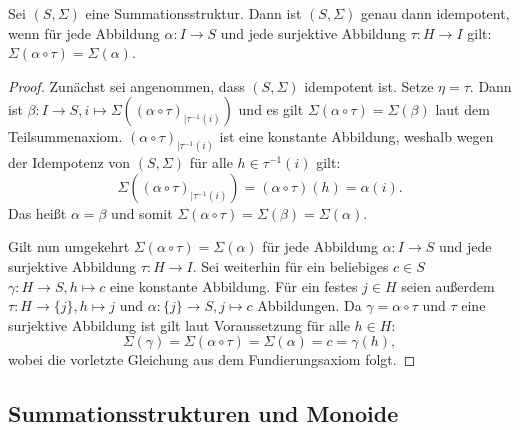 \documentclass{article}
\begin{document}
\begin{theorem}\label{Theorem_IdempotentSurjektion}
  Sei $(S, \Sigma)$ eine Summationsstruktur. Dann ist $(S, \Sigma)$ genau dann idempotent, 
  wenn für jede Abbildung $\alpha \colon I \to S$ und jede surjektive Abbildung $\tau \colon H \to I$ gilt:
  $\Sigma(\alpha \circ \tau) = \Sigma(\alpha)$.
\end{theorem}
\begin{proof}
  Zunächst sei angenommen, dass $(S, \Sigma)$ idempotent ist.
  Setze $\eta = \tau$. Dann ist $\beta \colon I \to S, i \mapsto \Sigma((\alpha \circ \tau)_{\mid \tau^{-1}(i)})$
  und es gilt $\Sigma(\alpha \circ \tau) = \Sigma(\beta)$ laut dem Teilsummenaxiom.
  $(\alpha \circ \tau)_{\mid \tau^{-1}(i)}$ ist eine konstante Abbildung,
  weshalb wegen der Idempotenz von $(S, \Sigma)$ für alle $h \in \tau^{-1}(i)$ gilt: 
  \begin{equation*}
    \Sigma((\alpha \circ \tau)_{\mid \tau^{-1}(i)}) = (\alpha \circ \tau)(h) = \alpha(i).
  \end{equation*}
  Das heißt $\alpha = \beta$ und somit $\Sigma(\alpha \circ \tau) = \Sigma(\beta) = \Sigma(\alpha)$.

  Gilt nun umgekehrt $\Sigma(\alpha \circ \tau) = \Sigma(\alpha)$ für jede Abbildung $\alpha \colon I \to S$ und jede surjektive Abbildung $\tau \colon H \to I$.
  Sei weiterhin für ein beliebiges $c \in S$ $\gamma \colon H \to S, h \mapsto c$ eine konstante Abbildung.
  Für ein festes $j \in H$ seien außerdem $\tau \colon H \to \{j\}, h \mapsto j$ und $\alpha \colon \{j\} \to S, j \mapsto c$ Abbildungen.
  Da $\gamma = \alpha \circ \tau$ und $\tau$ eine surjektive Abbildung ist gilt laut Voraussetzung
  für alle $h \in H$:
  \begin{equation*}
    \Sigma(\gamma) = \Sigma(\alpha \circ \tau) = \Sigma(\alpha) = c = \gamma(h),
  \end{equation*}
  wobei die vorletzte Gleichung aus dem Fundierungsaxiom folgt.
\end{proof}

\subsection{Summationsstrukturen und Monoide}
\end{document}
